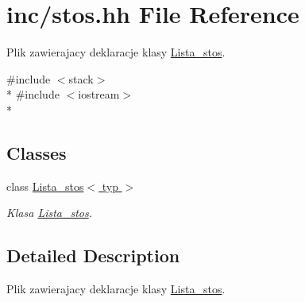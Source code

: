 \hypertarget{stos_8hh}{\section{inc/stos.hh File Reference}
\label{stos_8hh}
}


Plik zawierajacy deklaracje klasy \hyperlink{class_lista__stos}{Lista\-\_\-stos}.  


{\ttfamily \#include $<$stack$>$}\\*
{\ttfamily \#include $<$iostream$>$}\\*
\subsection*{Classes}
\begin{DoxyCompactItemize}
\item 
class \hyperlink{class_lista__stos}{Lista\-\_\-stos$<$ typ $>$}
\begin{DoxyCompactList}\small\item\em Klasa \hyperlink{class_lista__stos}{Lista\-\_\-stos}. \end{DoxyCompactList}\end{DoxyCompactItemize}


\subsection{Detailed Description}
Plik zawierajacy deklaracje klasy \hyperlink{class_lista__stos}{Lista\-\_\-stos}. 